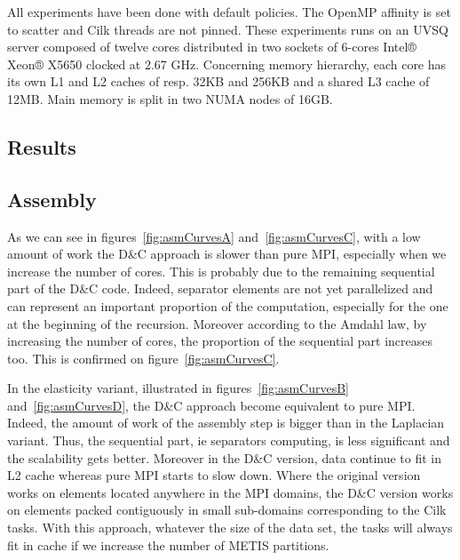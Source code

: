 \documentclass{IOS-Book-Article}
\begin{document}
All experiments have been done with default policies. The OpenMP affinity is set to scatter and Cilk threads are not pinned.
These experiments runs on an UVSQ server composed of twelve cores distributed in two sockets of 6-cores Intel® Xeon® X5650 clocked at 2.67 GHz.
Concerning memory hierarchy, each core has its own L1 and L2 caches of resp. 32KB and 256KB and a shared L3 cache of 12MB. Main memory is split in two NUMA nodes of 16GB.

\subsection{Results}
\subsection{Assembly}
As we can see in figures~\ref{fig:asmCurvesA} and~\ref{fig:asmCurvesC}, with a low amount of work the D\&C approach is slower than pure MPI, especially when we increase the number of cores.
This is probably due to the remaining sequential part of the D\&C code.
Indeed, separator elements are not yet parallelized and can represent an important proportion of the computation, especially for the one at the beginning of the recursion.
Moreover according to the Amdahl law, by increasing the number of cores, the proportion of the sequential part increases too. This is confirmed on figure~\ref{fig:asmCurvesC}.

In the elasticity variant, illustrated in figures~\ref{fig:asmCurvesB} and~\ref{fig:asmCurvesD}, the D\&C approach become equivalent to pure MPI.
Indeed, the amount of work of the assembly step is bigger than in the Laplacian variant.
Thus, the sequential part, ie separators computing, is less significant and the scalability gets better.
Moreover in the D\&C version, data continue to fit in L2 cache whereas pure MPI starts to slow down.
Where the original version works on elements located anywhere in the MPI domains, the D\&C version works on elements packed contiguously in small sub-domains corresponding to the Cilk tasks.
With this approach, whatever the size of the data set, the tasks will always fit in cache if we increase the number of METIS partitions.
\end{document}
